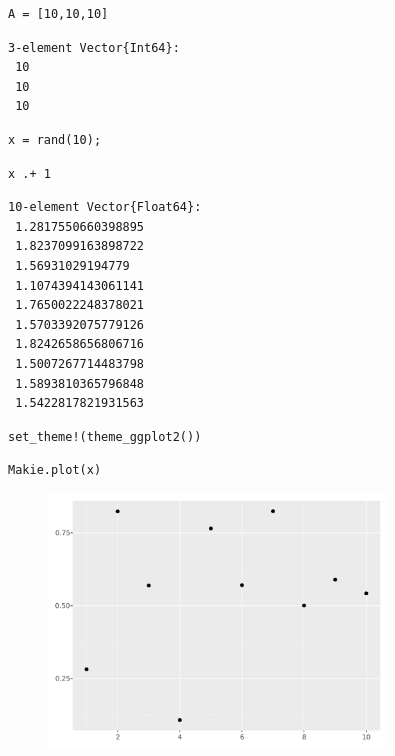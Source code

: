 \begin{lstlisting}[language=JuliaLocal, style=julia]
A = [10,10,10]
\end{lstlisting}

\begin{verbatim}
3-element Vector{Int64}:
 10
 10
 10
\end{verbatim}

\begin{lstlisting}[language=JuliaLocal, style=julia]
x = rand(10);
\end{lstlisting}

\begin{lstlisting}[language=JuliaLocal, style=julia]
x .+ 1
\end{lstlisting}

\begin{verbatim}
10-element Vector{Float64}:
 1.2817550660398895
 1.8237099163898722
 1.56931029194779
 1.1074394143061141
 1.7650022248378021
 1.5703392075779126
 1.8242658656806716
 1.5007267714483798
 1.5893810365796848
 1.5422817821931563
\end{verbatim}

\begin{lstlisting}[language=JuliaLocal, style=julia]
set_theme!(theme_ggplot2())
\end{lstlisting}

\begin{lstlisting}[language=JuliaLocal, style=julia]
Makie.plot(x)
\end{lstlisting}

\begin{figure}[H]
	\centering
	\includegraphics[width=0.8\textwidth]{./figures/notebooktest_figure2.pdf}
	\label{fig:notebooktest_figure2.pdf}

\end{figure}

